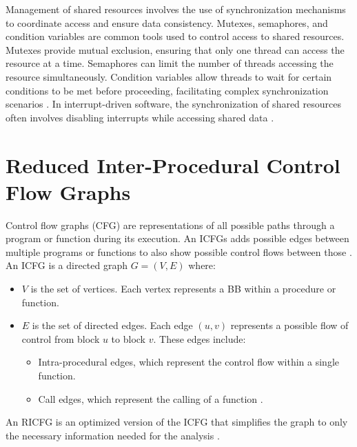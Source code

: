 \documentclass[
fancyheadings, %
%
%
]{stsreprt}
\begin{document}
{		Management of shared resources involves the use of synchronization mechanisms to coordinate access and ensure data consistency. Mutexes, semaphores, and condition variables are common tools used to control access to shared resources. Mutexes provide mutual exclusion, ensuring that only one thread can access the resource at a time. Semaphores can limit the number of threads accessing the resource simultaneously. Condition variables allow threads to wait for certain conditions to be met before proceeding, facilitating complex synchronization scenarios \cite{herlihy2008}. In interrupt-driven software, the synchronization of shared resources often involves disabling interrupts while accessing shared data \cite{chopra2019}.
		
		\section{Reduced Inter-Procedural Control Flow Graphs}
		Control flow graphs (\acs{CFG}) are representations of all possible paths through a program or function during its execution. An \acp{ICFG} adds possible edges between multiple programs or functions to also show possible control flows between those \cite{mehl2008}.\\
		An \acl{ICFG} is a directed graph $G = (V, E)$ where:
		\begin{itemize}
			\item $V$ is the set of vertices. Each vertex represents a \ac{BB} within a procedure or function.
			\item $E$ is the set of directed edges. Each edge $(u, v)$ represents a possible flow of control from block $u$ to block $v$. These edges include:
			\begin{itemize}
				\item Intra-procedural edges, which represent the control flow within a single function.
				\item Call edges, which represent the calling of a function \cite{mehl2008}.
			\end{itemize}
		\end{itemize}
		 An \ac{RICFG} is an optimized version of the \ac{ICFG} that simplifies the graph to only the necessary information needed for the analysis \cite{wang2020}.
		
		\begin{figure}[H]

			\centering
			\begin{tikzpicture}[node distance=2cm, scale=0.85, transform shape]
				

\end{tikzpicture}
\end{figure}}
\end{document}
